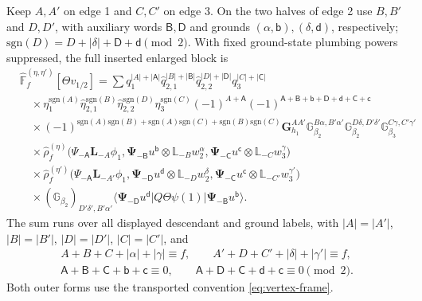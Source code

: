 \documentclass[11pt]{article}
\newcommand{\hFF}{\widehat{\mathbb F}}
\numberwithin{equation}{section}
\begin{document}
Keep $A,A'$ on edge 1 and $C,C'$ on edge 3. On the two halves of
edge 2 use $B,B'$ and $D,D'$, with auxiliary words $\mathsf B,\mathsf D$
and grounds $(\alpha,\mathsf b),(\delta,\mathsf d)$, respectively;
$\mathrm{sgn}(D)=D+|\delta|+\mathsf D+\mathsf d\pmod2$.
With fixed ground-state plumbing powers suppressed, the full inserted
enlarged block is
\begin{align}
 &\hFF_f^{(\eta,\eta')}[\Theta v_{1/2}]
 =\sum
 q_1^{|A|+|\mathsf A|}
 \hat q_{2,1}^{|B|+|\mathsf B|}
 \hat q_{2,2}^{|D|+|\mathsf D|}
 q_3^{|C|+|\mathsf C|}\nonumber\\
 &\quad\times\eta_1^{\mathrm{sgn}(A)}
 \hat\eta_{2,1}^{\mathrm{sgn}(B)}
 \hat\eta_{2,2}^{\mathrm{sgn}(D)}
 \eta_3^{\mathrm{sgn}(C)}
 (-1)^{A+\mathsf A}
 (-1)^{\mathsf A+\mathsf B+\mathsf b+\mathsf D+\mathsf d+\mathsf C+\mathsf c}
 \nonumber\\
 &\quad\times
 (-1)^{\mathrm{sgn}(A)\mathrm{sgn}(B)+
        \mathrm{sgn}(A)\mathrm{sgn}(C)+\mathrm{sgn}(B)\mathrm{sgn}(C)}
 \mathbf G_{h_1}^{AA'}\mathbb G_{\beta_2}^{B\alpha,B'\alpha'}
 \mathbb G_{\beta_2}^{D\delta,D'\delta'}
 \mathbb G_{\beta_3}^{C\gamma,C'\gamma'}\nonumber\\
 &\quad\times\hat\rho_f^{(\eta)}\bigl(
 \Psi_{-\mathsf A}\mathbf L_{-A}\phi_1,
 \boldsymbol\Psi_{-\mathsf B}u^{\mathsf b}\otimes\mathbb L_{-B}w_2^\alpha,
 \boldsymbol\Psi_{-\mathsf C}u^{\mathsf c}\otimes\mathbb L_{-C}w_3^\gamma\bigr)
 \nonumber\\
 &\quad\times\hat\rho_f^{(\eta')}\bigl(
 \Psi_{-\mathsf A}\mathbf L_{-A'}\phi_1,
 \boldsymbol\Psi_{-\mathsf D}u^{\mathsf d}\otimes\mathbb L_{-D}w_2^\delta,
 \boldsymbol\Psi_{-\mathsf C}u^{\mathsf c}\otimes\mathbb L_{-C'}w_3^{\gamma'}\bigr)
 \nonumber\\
 &\quad\times(\mathbb G_{\beta_2})_{D'\delta',B'\alpha'}
 \langle\boldsymbol\Psi_{-\mathsf D}u^{\mathsf d}|
 Q\Theta\psi(1)|\boldsymbol\Psi_{-\mathsf B}u^{\mathsf b}\rangle.
 \label{eq:inserted-pbw-definition}
\end{align}
The sum runs over all displayed descendant and ground labels, with
$|A|=|A'|$, $|B|=|B'|$, $|D|=|D'|$, $|C|=|C'|$, and
\begin{gather}
 A+B+C+|\alpha|+|\gamma|\equiv f,\qquad
 A'+D+C'+|\delta|+|\gamma'|\equiv f,\nonumber\\
 \mathsf A+\mathsf B+\mathsf C+\mathsf b+\mathsf c\equiv0,\qquad
 \mathsf A+\mathsf D+\mathsf C+\mathsf d+\mathsf c\equiv0\pmod2.
 \label{eq:inserted-pbw-parities}
\end{gather}
Both outer forms use the transported convention \eqref{eq:vertex-frame}.
\end{document}
